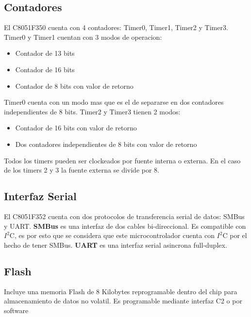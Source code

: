\subsection{Contadores}\label{sec:contadores}
El C8051F350 cuenta con 4 contadores: Timer0, Timer1, Timer2 y Timer3. Timer0 y Timer1 cuentan con 3 modos de operacion:
\begin{itemize}
  \item Contador de 13 bits
  \item Contador de 16 bits
  \item Contador de 8 bits con valor de retorno
\end{itemize}
Timer0 cuenta con un modo mas que es el de separarse en dos contadores independientes de 8 bits.
Timer2 y Timer3 tienen 2 modos:
 \begin{itemize}
   \item Contador de 16 bits con valor de retorno
   \item Dos contadores independientes de 8 bits con valor de retorno
 \end{itemize}

Todos los timers pueden ser clockeados por fuente interna o externa. En el caso de los timers 2 y 3 la fuente externa se divide por 8.

\subsection{Interfaz Serial}\label{sec:serial}
El C8051F352 cuenta con dos protocolos de transferencia serial de datos: SMBus y UART. \textbf{SMBus} es una interfaz de dos cables bi-direccional. Es compatible con $I^{2}$C, es por esto que se considera que este microcontrolador cuenta con $I^{2}$C por el hecho de tener SMBus. \textbf{UART} es una interfaz serial asincrona full-duplex.

\subsection{Flash}
Incluye una memoria Flash de 8 Kilobytes reprogramable dentro del chip para almacenamiento de datos no volatil. Es programable mediante interfaz C2 o por software